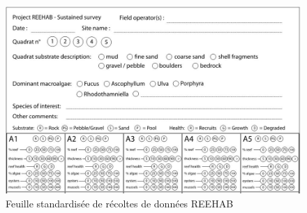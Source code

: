 \documentclass[12pt]{report}
\begin{document}
\begin{figure}
    \centering
    \includegraphics[height = \textwidth, width = .9\textheight,angle = 90]{reehab_sheet.jpg}
    \caption[]{Feuille standardisée de récoltes de données REEHAB}
    \label{fig:2anx}
\end{figure}
\end{document}
